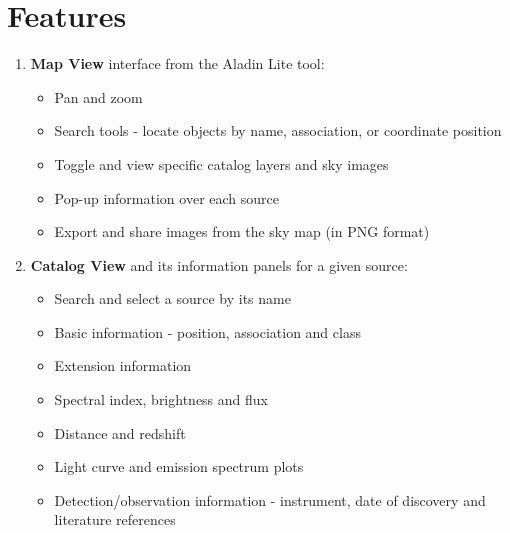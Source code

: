 \renewcommand{\thefootnote}{\fnsymbol{footnote}}

\section{Features}

\begin{enumerate}

\item \textbf{Map View} interface from the Aladin Lite tool:

\begin{itemize}
\item Pan and zoom
\item Search tools - locate objects by name, association, or coordinate position
\item Toggle and view specific catalog layers and sky images
\item Pop-up information over each source
\item Export and share images from the sky map (in PNG format)
\end{itemize}

\item \textbf{Catalog View} and its information panels for a given source:

\begin{itemize}

\item Search and select a source by its name
\item Basic information - position, association and class
\item Extension information
\item Spectral index, brightness and flux
\item Distance and redshift
\item Light curve and emission spectrum plots
\item Detection/observation information - instrument, date of discovery and literature references

\end{itemize}

\end{enumerate}
